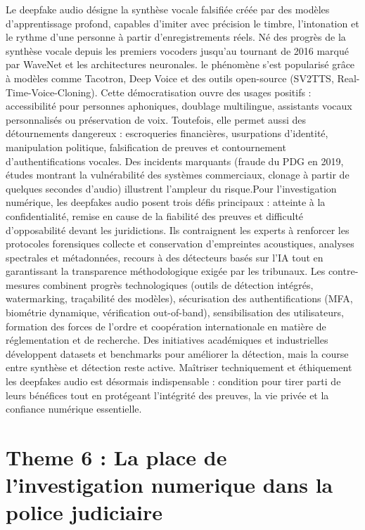 \documentclass[12pt]{article}
\begin{document}
Le deepfake audio désigne la synthèse vocale falsifiée créée par des modèles d’apprentissage profond, capables d’imiter avec précision le timbre, l’intonation et le rythme d’une personne à partir d’enregistrements réels. Né des progrès de la synthèse vocale depuis les premiers vocoders jusqu’au tournant de 2016 marqué par WaveNet et les architectures neuronales. le phénomène s’est popularisé grâce à modèles comme Tacotron, Deep Voice et des outils open-source (SV2TTS, Real-Time-Voice-Cloning). Cette démocratisation ouvre des usages positifs : accessibilité pour personnes aphoniques, doublage multilingue, assistants vocaux personnalisés ou préservation de voix. Toutefois, elle permet aussi des détournements dangereux : escroqueries financières, usurpations d’identité, manipulation politique, falsification de preuves et contournement d’authentifications vocales. Des incidents marquants (fraude du PDG en 2019, études montrant la vulnérabilité des systèmes commerciaux, clonage à partir de quelques secondes d’audio) illustrent l’ampleur du risque.Pour l’investigation numérique, les deepfakes audio posent trois défis principaux : atteinte à la confidentialité, remise en cause de la fiabilité des preuves et difficulté d’opposabilité devant les juridictions. Ils contraignent les experts à renforcer les protocoles forensiques collecte et conservation d’empreintes acoustiques, analyses spectrales et métadonnées, recours à des détecteurs basés sur l’IA tout en garantissant la transparence méthodologique exigée par les tribunaux. Les contre-mesures combinent progrès technologiques (outils de détection intégrés, watermarking, traçabilité des modèles), sécurisation des authentifications (MFA, biométrie dynamique, vérification out-of-band), sensibilisation des utilisateurs, formation des forces de l’ordre et coopération internationale en matière de réglementation et de recherche. Des initiatives académiques et industrielles développent datasets et benchmarks pour améliorer la détection, mais la course entre synthèse et détection reste active. Maîtriser techniquement et éthiquement les deepfakes audio est désormais indispensable : condition pour tirer parti de leurs bénéfices tout en protégeant l’intégrité des preuves, la vie privée et la confiance numérique essentielle.

\section{Theme 6 : La place de l'investigation numerique dans la police judiciaire}
\end{document}
